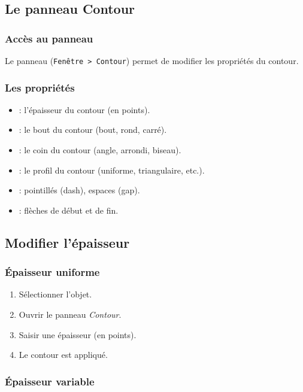 \subsection{Le panneau Contour}

\subsubsection{Accès au panneau}

Le panneau  (\texttt{Fenêtre > Contour}) permet de modifier les propriétés du contour.

\subsubsection{Les propriétés}

\begin{itemize}
    \item {} : l'épaisseur du contour (en points).
    \item {} : le bout du contour (bout, rond, carré).
    \item {} : le coin du contour (angle, arrondi, biseau).
    \item {} : le profil du contour (uniforme, triangulaire, etc.).
    \item {} : pointillés (dash), espaces (gap).
    \item {} : flèches de début et de fin.
\end{itemize}

\subsection{Modifier l'épaisseur}

\subsubsection{Épaisseur uniforme}

\begin{enumerate}
    \item Sélectionner l'objet.
    \item Ouvrir le panneau \emph{Contour}.
    \item Saisir une épaisseur (en points).
    \item Le contour est appliqué.
\end{enumerate}

\subsubsection{Épaisseur variable}

